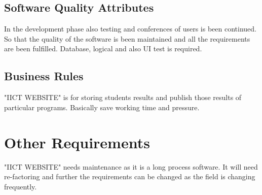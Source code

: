 \documentclass{scrreprt}
\begin{document}
\section{Software Quality Attributes}
In the development phase also testing and conferences of users is been continued. So that the quality of the software is been maintained and all the requirements are been fulfilled.
\newline
Database, logical and also UI test is required. 

\section{Business Rules}
"IICT WEBSITE" is for storing students results and publish those results of particular programs.
\newline
Basically save working time and pressure. 


\chapter{Other Requirements}
"IICT WEBSITE" needs maintenance as it is a long process software. It will need re-factoring and further the requirements can be changed as the field is changing frequently. 

\addappendix
\end{document}
